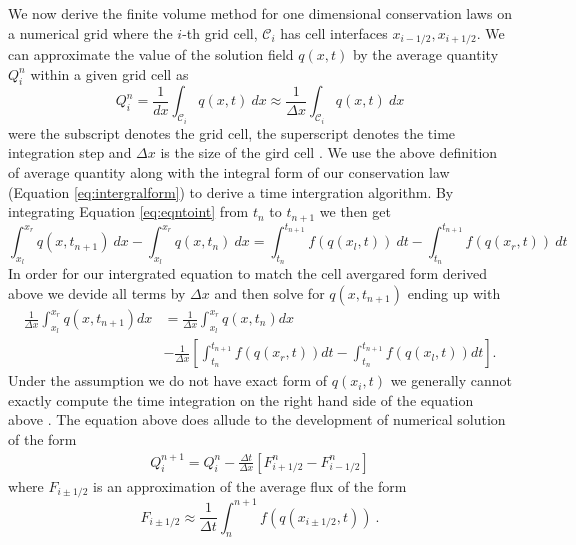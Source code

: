 \documentclass[review,onefignum,onetabnum]{siamart171218}
\begin{document}
We now derive the finite volume method for one dimensional conservation laws on a numerical grid where the $i$-th grid cell, $\mathcal{C}_i$ has cell interfaces $x_{i-1/2}, x_{i+1/2}$. We can approximate the value of the solution field $q(x,t)$ by the average quantity $Q_i^n$ within a given grid cell as 
\begin{equation}
    Q_i^n  = \frac{1}{dx} \int_{\mathcal{C}_i} q(x,t)\: dx \approx \frac{1}{\Delta x} \int_{\mathcal{C}_i} q(x,t) \: dx
\end{equation}
were the subscript denotes the grid cell, the superscript denotes the time integration step and $\Delta x$ is the size of the gird cell \cite{leveque_2002, comp_seis}. We use the above definition of average quantity along with the integral form of our conservation law (Equation \cref{eq:intergralform}) to derive a time intergration algorithm. By integrating Equation  \cref{eq:eqntoint} from $t_n$ to $t_{n+1}$ we then get 
\begin{equation}
    \int_{x_l}^{x_r} q(x,t_{n+1}) \: dx - \int_{x_l}^{x_r} q(x,t_n) \: dx = \int_{t_n}^{t_{n+1}} f(q(x_l,t)) \: dt  - \int_{t_n}^{t_{n+1}} f(q(x_r ,t)) \: dt
\end{equation}
In order for our intergrated equation to match the cell avergared form derived above we devide all terms by $\Delta x$ and then solve for $q(x,t_{n+1})$ ending up with 
\begin{equation}
\begin{aligned}
    \frac{1}{\Delta x} \int_{x_l}^{x_r} q(x,t_{n+1}) dx  &= \frac{1}{\Delta x} \int_{x_l}^{x_r} q(x,t_n) dx \\
    &- \frac{1}{\Delta x} \left[ \int_{t_n}^{t_{n+1}} f(q(x_r ,t)) dt - \int_{t_n}^{t_{n+1}} f(q(x_l,t)) dt \right].
\end{aligned}
\end{equation}
Under the assumption we do not have exact form of $q(x_i,t)$ we generally cannot exactly compute the time integration on the right hand side of the equation above \cite{leveque_2002}. The equation above does allude to the development of numerical solution of the form 
\begin{align}
    Q_i^{n+1}  = Q_i^{n} - \frac{\Delta t}{\Delta x} \left[ F^n_{i + 1/2} - F^n_{i - 1/2} \right]
\end{align}
where $F_{i\pm 1/2}$ is an approximation of the average flux \cite{leveque_2002} of the form 
\begin{equation}
    F_{i \pm 1/2} \approx \frac{1}{\Delta t} \int_n^{n+1} f(q(x_{i\pm 1/2}, t)) \: .
\end{equation}
\end{document}
